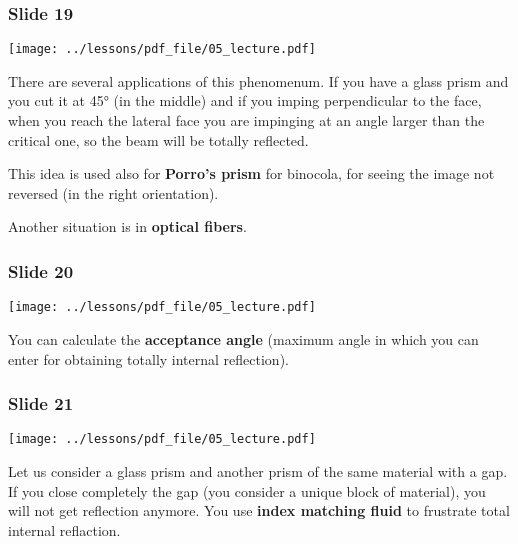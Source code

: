 \documentclass[../main/main.tex]{subfiles}
\begin{document}
\subsubsection*{Slide 19}

\begin{minipage}[]{0.5\linewidth}
\centering
\texttt{[image: ../lessons/pdf\_file/05\_lecture.pdf]}
\end{minipage}
\hspace{0.3cm}\vspace{0.3cm}
\begin{minipage}[c]{0.47\linewidth}

There are several applications of this phenomenum. If you have a glass prism and you cut it at 45° (in the middle) and if you imping perpendicular to the face, when you reach the lateral face you are impinging at an angle larger than the critical one, so the beam will be totally reflected.

This idea is used also for \textbf{Porro's prism} for binocola, for seeing the image not reversed (in the right orientation).

Another situation is in \textbf{optical fibers}.

\end{minipage}


\subsubsection*{Slide 20}

\begin{minipage}[]{0.5\linewidth}
\centering
\texttt{[image: ../lessons/pdf\_file/05\_lecture.pdf]}
\end{minipage}
\hspace{0.3cm}\vspace{0.3cm}
\begin{minipage}[c]{0.47\linewidth}

You can calculate the \textbf{acceptance angle} (maximum angle in which you can enter for obtaining totally internal reflection).

\end{minipage}


\subsubsection*{Slide 21}

\begin{minipage}[]{0.5\linewidth}
\centering
\texttt{[image: ../lessons/pdf\_file/05\_lecture.pdf]}
\end{minipage}
\hspace{0.3cm}\vspace{0.3cm}
\begin{minipage}[c]{0.47\linewidth}

Let us consider a glass prism and another prism of the same material with a gap. If you close completely the gap (you consider a unique block of material), you will not get reflection anymore. You use \textbf{index matching fluid} to frustrate total internal reflaction.

\end{minipage}
\end{document}
